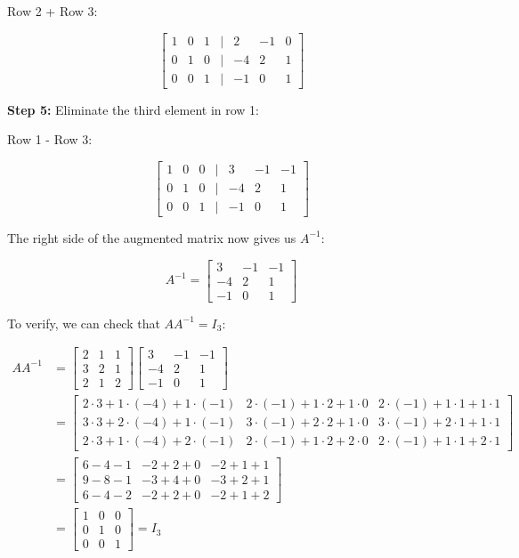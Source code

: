Row 2 + Row 3:

\[
    \begin{bmatrix}
    1 & 0 & 1 & | & 2 & -1 & 0 \\
    0 & 1 & 0 & | & -4 & 2 & 1 \\
    0 & 0 & 1 & | & -1 & 0 & 1
    \end{bmatrix}
\]

\textbf{Step 5:} Eliminate the third element in row 1:

Row 1 - Row 3:

\[
    \begin{bmatrix}
    1 & 0 & 0 & | & 3 & -1 & -1 \\
    0 & 1 & 0 & | & -4 & 2 & 1 \\
    0 & 0 & 1 & | & -1 & 0 & 1
    \end{bmatrix}
\]

The right side of the augmented matrix now gives us \(A^{-1}\):

\[
    A^{-1} = 
    \begin{bmatrix}
    3 & -1 & -1 \\
    -4 & 2 & 1 \\
    -1 & 0 & 1
    \end{bmatrix}
\]

To verify, we can check that \(AA^{-1} = I_3\):

\begin{align*}
    AA^{-1} &= 
    \begin{bmatrix}
    2 & 1 & 1 \\
    3 & 2 & 1 \\
    2 & 1 & 2
    \end{bmatrix}
    \begin{bmatrix}
    3 & -1 & -1 \\
    -4 & 2 & 1 \\
    -1 & 0 & 1
    \end{bmatrix} \\
    &= 
    \begin{bmatrix}
    2 \cdot 3 + 1 \cdot (-4) + 1 \cdot (-1) & 2 \cdot (-1) + 1 \cdot 2 + 1 \cdot 0 & 2 \cdot (-1) + 1 \cdot 1 + 1 \cdot 1 \\
    3 \cdot 3 + 2 \cdot (-4) + 1 \cdot (-1) & 3 \cdot (-1) + 2 \cdot 2 + 1 \cdot 0 & 3 \cdot (-1) + 2 \cdot 1 + 1 \cdot 1 \\
    2 \cdot 3 + 1 \cdot (-4) + 2 \cdot (-1) & 2 \cdot (-1) + 1 \cdot 2 + 2 \cdot 0 & 2 \cdot (-1) + 1 \cdot 1 + 2 \cdot 1
    \end{bmatrix} \\
    &= 
    \begin{bmatrix}
    6 - 4 - 1 & -2 + 2 + 0 & -2 + 1 + 1 \\
    9 - 8 - 1 & -3 + 4 + 0 & -3 + 2 + 1 \\
    6 - 4 - 2 & -2 + 2 + 0 & -2 + 1 + 2
    \end{bmatrix} \\
    &= 
    \begin{bmatrix}
    1 & 0 & 0 \\
    0 & 1 & 0 \\
    0 & 0 & 1
    \end{bmatrix} = I_3
\end{align*}

